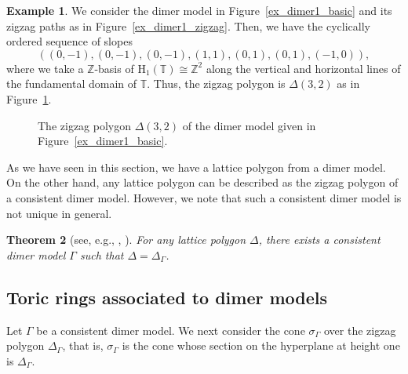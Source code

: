 \documentclass[pdftex]{sigma}
\numberwithin{equation}{section}
\newtheorem{Theorem}{Theorem}[section]
\theoremstyle{definition}
\newtheorem{Example}[Theorem]{Example}
\newcommand{\ZZ}{\mathbb{Z}}
\newcommand{\TT}{\mathbb{T}}
\newcommand{\rmH}{\mathrm{H}}
\begin{document}
\begin{Example}
We consider the dimer model in Figure~\ref{ex_dimer1_basic} and its zigzag paths as in Figure~\ref{ex_dimer1_zigzag}.
Then, we have the cyclically ordered sequence of slopes
\[
((0,-1), (0,-1), (0,-1), (1,1), (0,1), (0,1), (-1,0)),
\]
where we take a $\ZZ$-basis of $\rmH_1(\TT)\cong\ZZ^2$ along the vertical and horizontal lines of the fundamental domain of $\TT$.
Thus, the zigzag polygon is $\Delta(3,2)$ as in Figure~\ref{ex_zigzagpolygon1}.

\begin{figure}[!ht]
\centering
{}

\vspace{-2mm}

\caption{The zigzag polygon $\Delta(3,2)$ of the dimer model given in Figure~\ref{ex_dimer1_basic}.}\label{ex_zigzagpolygon1}
\end{figure}
\end{Example}

As we have seen in this section, we have a lattice polygon from a dimer model.
On the other hand, any lattice polygon can be described as the zigzag polygon of a consistent dimer model.
However, we note that such a consistent dimer model is not unique in general.

\begin{Theorem}[{see, e.g., \cite[Theorem~6.1]{Gul}, \cite[Corollary~1.2]{IU_special}}]
\label{exist_dimer}
For any lattice polygon $\Delta$, there exists a consistent dimer model $\Gamma$ such that $\Delta=\Delta_\Gamma$.
\end{Theorem}

\subsection{Toric rings associated to dimer models}\label{subsec_toric}

Let $\Gamma$ be a consistent dimer model.
We next consider the cone $\sigma_\Gamma$ over the zigzag polygon $\Delta_\Gamma$,
that is, $\sigma_\Gamma$ is the cone whose section on the hyperplane at height one is $\Delta_\Gamma$.
\end{document}
